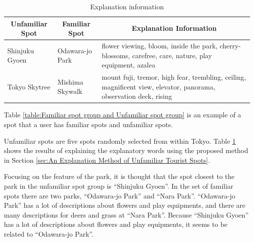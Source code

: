 \documentclass[journal]{IAENGtran}
\begin{document}
\begin{table}[t]
  \caption{Explanation information}
  \label{table:Explanation information}
  \centering
  \begin{tabular}{l|l|l}
  \hline
  \multicolumn{1}{c|}{Unfamiliar Spot} & \multicolumn{1}{c|}{Familiar Spot} & \multicolumn{1}{c}{Explanation Information}                     \\ \hline
  Shinjuku Gyoen                      & Odawara-jo Park                         & flower viewing, bloom, inside the park, cherry-blossoms, carefree, care, nature, play equipment, azalea          \\
  Tokyo Skytree                     & Mishima Skywalk                    & mount fuji, tremor, high fear, trembling, ceiling, magnificent view, elevator, panorama, observation deck, rising
 \\ \hline
  \end{tabular}
\end{table}

Table \ref{table:Familiar spot group and Unfamiliar spot group} is an example of a spot that a user has familiar spots and unfamiliar spots.

Unfamiliar spots are five spots randomly selected from within Tokyo.
Table \ref{table:Explanation information} shows the results of explaining the explanatory words using the proposed method in Section \ref{sec:An Explanation Method of Unfamiliar Tourist Spots}.

Focusing on the feature of the park, it is thought that the spot closest to the park in the unfamiliar spot group is ``Shinjuku Gyoen''.
In the set of familiar spots there are two parks, ``Odawara-jo Park'' and ``Nara Park''.
``Odawara-jo Park'' has a lot of descriptions about flowers and play equipments, and there are many descriptions for deers and grass at ``Nara Park''.
Because ``Shinjuku Gyoen'' has a lot of descriptions about flowers and play equipments, it seems to be related to ``Odawara-jo Park''.
\end{document}
